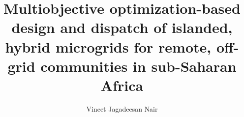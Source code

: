 \documentclass[final,3p,times]{elsarticle}
\begin{document}
\begin{frontmatter}

\title{Multiobjective optimization-based design and dispatch of islanded, hybrid microgrids for remote, off-grid communities in sub-Saharan Africa} %

\author[1]{Vineet Jagadeesan Nair} %


\begin{abstract}


\end{abstract}
\end{frontmatter}
\end{document}
